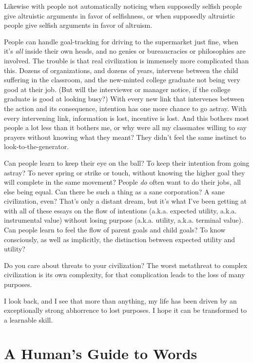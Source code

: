 {
 Likewise with people not automatically noticing when supposedly
selfish people give altruistic arguments in favor of selfishness, or
when supposedly altruistic people give selfish arguments in favor of
altruism.}

{
 People can handle goal-tracking for driving to the supermarket
just fine, when it's \textit{all} inside their own
heads, and no genies or bureaucracies or philosophies are involved. The
trouble is that real civilization is immensely more complicated than
this. Dozens of organizations, and dozens of years, intervene between
the child suffering in the classroom, and the new-minted college
graduate not being very good at their job. (But will the interviewer or
manager notice, if the college graduate is good at looking busy?) With
every new link that intervenes between the action and its consequence,
intention has one more chance to go astray. With every intervening
link, information is lost, incentive is lost. And this bothers most
people a lot less than it bothers me, or why were all my classmates
willing to say prayers without knowing what they meant? They
didn't feel the same instinct to
look-to-the-generator.}

{
 Can people learn to keep their eye on the ball? To keep their
intention from going astray? To never spring or strike or touch,
without knowing the higher goal they will complete in the same
movement? People \textit{do} often want to do their jobs, all else
being equal. Can there be such a thing as a sane corporation? A sane
civilization, even? That's only a distant dream, but
it's what I've been getting at with all
of these essays on the flow of intentions (a.k.a. expected utility,
a.k.a. instrumental value) without losing purpose (a.k.a. utility,
a.k.a. terminal value). Can people learn to feel the flow of parent
goals and child goals? To know consciously, as well as implicitly, the
distinction between expected utility and utility?}

{
 Do you care about threats to your civilization? The worst
metathreat to complex civilization is its own complexity, for that
complication leads to the loss of many purposes.}

{
 I look back, and I see that more than anything, my life has been
driven by an exceptionally strong abhorrence to lost purposes. I hope
it can be transformed to a learnable skill.}

\myendsectiontext


\bigskip

\chapter{A Human's Guide to Words}

